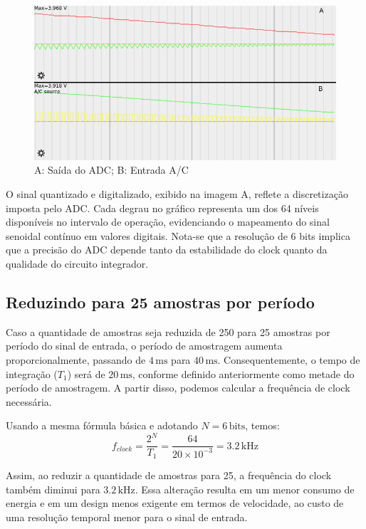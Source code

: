 \begin{figure}[H]
    \centering
    \includegraphics[width=1\linewidth]{03_results/assets/signal_output.png}
    \caption{A: Saída do ADC; B: Entrada A/C}
    \label{fig:falstad_simulator_output}
\end{figure}

O sinal quantizado e digitalizado, exibido na imagem A, reflete a discretização imposta pelo ADC. Cada degrau no gráfico representa um dos 64 níveis disponíveis no intervalo de operação, evidenciando o mapeamento do sinal senoidal contínuo em valores digitais. Nota-se que a resolução de 6 bits implica que a precisão do ADC depende tanto da estabilidade do clock quanto da qualidade do circuito integrador.

\subsection{Reduzindo para 25 amostras por período}
Caso a quantidade de amostras seja reduzida de 250 para 25 amostras por período do sinal de entrada, o período de amostragem aumenta proporcionalmente, passando de $4\,\text{ms}$ para $40\, \text{ms}$. Consequentemente, o tempo de integração ($T_1$) será de $20\, \text{ms}$, conforme definido anteriormente como metade do período de amostragem. A partir disso, podemos calcular a frequência de clock necessária.

Usando a mesma fórmula básica e adotando $N=6\,\text{bits}$, temos:
$$
    f_{clock} = \frac{2^N}{T_{1}} = \frac{64}{20 \times 10^{-3}} = 3.2 \, \text{kHz}
$$

Assim, ao reduzir a quantidade de amostras para 25, a frequência do clock também diminui para \textbf{$3.2 \, \text{kHz}$}. Essa alteração resulta em um menor consumo de energia e em um design menos exigente em termos de velocidade, ao custo de uma resolução temporal menor para o sinal de entrada.

